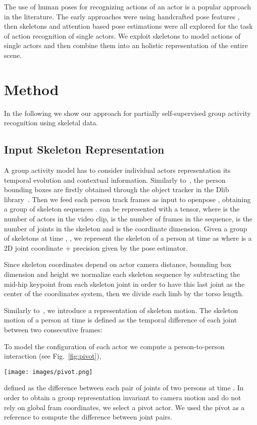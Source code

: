 \documentclass[a4paper,conference]{IEEEtran}
\begin{document}
The use of human poses for recognizing actions of an actor is a popular approach in the literature. The early approaches were using handcrafted pose features \cite{xiaohan2015joint,wang2013approach}, then skeletons \cite{song2017end,liu2016spatio} and attention based pose estimations \cite{cao2016action,cheron2015p} were all explored for the task of action recognition of single actors. We exploit skeletons to model actions of single actors and then combine them into an holistic representation of the entire scene.



\section{Method}
In the following we show our approach for partially self-supervised group activity recognition using skeletal data.

\subsection{Input Skeleton Representation}
A group activity model has to consider individual actors  representation its temporal evolution and contextual information. Similarly to~\cite{msibrahiCVPR16deepactivity}, the person bounding boxes are firstly obtained through the object tracker in the Dlib library~\cite{article}. Then we feed each  person track frames as input to  openpose \cite{cao2018openpose}, obtaining a group of skeleton sequences .  can be represented with a  tensor, where  is the number of actors in the video clip,  is the number of frames in the sequence,  is the number of joints in the skeleton and  is the coordinate dimension. Given a group of skeletons at time , , we represent the skeleton of a person  at time  as 
 where  is a 2D joint coordinate + precision given by the pose estimator. 

Since skeleton coordinates depend on actor camera distance, bounding box dimension and height we normalize each skeleton sequence by subtracting the mid-hip keypoint from each skeleton joint in order to have this last joint as the center of the coordinates system, then we divide each limb by the torso length.

Similarly to~\cite{hcn}, we introduce a representation of skeleton motion. The skeleton motion of a person  at time  is defined as the temporal difference of each joint between two consecutive frames: 


To model the configuration of each actor  we compute a person-to-person interaction  (see Fig.~\ref{fig:pivot}), 
\begin{figure*}
	\centering
\texttt{[image: images/pivot.png]}
\caption{\label{fig:pivot} Pivot selection among players. We pick the players closest to the average joint centroid of all players. Pivot is shown in yellow.}
	\end{figure*}
defined as the difference between each pair of joints of two persons at time . In order to obtain a group representation invariant to camera motion and do not rely on global fram coordinates,  we select a pivot actor.  We used the pivot as a  reference to compute the difference between joint pairs. 
\end{document}

